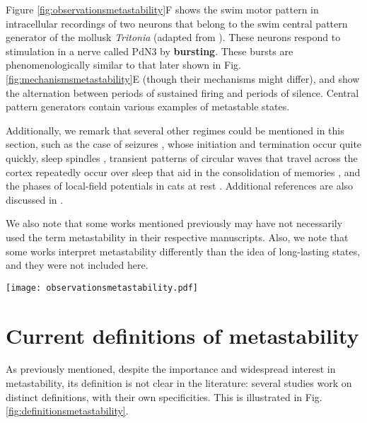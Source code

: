 \documentclass[reprint,onecolumn,superscriptaddress,showpacs,amsmath,amssymb,aps,floatfix]{revtex4-2}
\theoremstyle{definition}
\newcommand{\Emph}[1]{\textbf{#1}}
\begin{document}
Figure \ref{fig:observationsmetastability}F shows the swim motor pattern in intracellular recordings of two neurons that belong to the swim central pattern generator of the mollusk \textit{Tritonia} \cite{sakurai2016recruitment} (adapted from \cite{sakurai2016recruitment}). These neurons respond to stimulation in a nerve called PdN3 by \Emph{bursting}. These bursts are phenomenologically similar to that later shown in Fig. \ref{fig:mechanismsmetastability}E (though their mechanisms might differ), and show the alternation between periods of sustained  firing and periods of silence. Central pattern generators \cite{marder2001central} contain various examples of metastable states. 

Additionally, we remark that several other regimes could be mentioned in this section, such as the case of seizures \cite{curtis2015initiation, babloyantz1986low}, whose initiation and termination occur quite quickly, sleep spindles \cite{fernandez2020sleep}, transient patterns of circular waves that travel across the cortex repeatedly occur over sleep that aid in the consolidation of memories \cite{muller2016rotating}, and the phases of local-field potentials in cats at rest \cite{tognoli2014metastable, popa2009constracting}. Additional references are also discussed in \cite{tsuda2009hypotheses}.

We also note that some works mentioned previously may have not necessarily used the term metastability in their respective manuscripts. Also, we note that some works interpret metastability differently than the idea of long-lasting states, and they were not included here.
%
\begin{figure*}[hbt]
    \centering
    \texttt{[image: observationsmetastability.pdf]}
    \caption{\textbf{Various observations reveal regimes in which brain activity evolves as a sequence of well-defined states that are transient but long lived.} Each panel corresponds to one observation, taken from references cited and better explained in the main text, and has a classification of the behavior into the subtypes of metastability we define in the text.
    }
    \label{fig:observationsmetastability}
\end{figure*}

\section{Current definitions of metastability}
As previously mentioned, despite the importance and widespread interest in metastability, its definition is not clear in the literature: several studies work on distinct definitions, with their own specificities. This is illustrated in Fig. \ref{fig:definitionsmetastability}.
\end{document}
